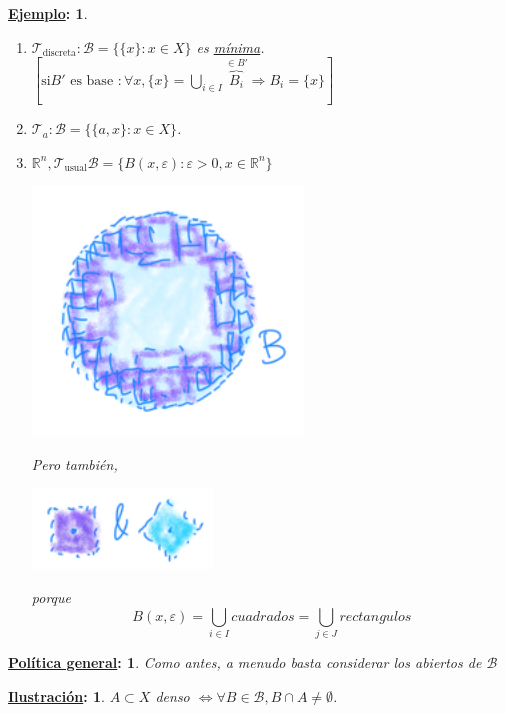 \documentclass[10pt,a4paper,openright]{book}
\theoremstyle{break}
\newtheorem*{ej}{\underline{Ejemplo}:}
\newtheorem*{pg}{\underline{Política general}:}
\newtheorem*{il}{\underline{Ilustración}:}
\begin{document}
\begin{ej}
\begin{enumerate}
    \item $\mathcal{T}_{\text{discreta}} : \mathcal{B} = \{\{x\} : x \in X\}$ es \underline{mínima}. $\left[ \text{si} B' \text{ es base } : \forall x, \{x\} = \bigcup_{i \in  I} \overbrace{B_i}^{\in B'} \Rightarrow B_i = \{x\} \right]$ 
    \item $\mathcal{T}_a: \mathcal{B} = \{\{a, x\} : x \in X\}$.
    \item $\mathbb{R}^n, \mathcal{T}_{\text{usual}} \mathcal{B} = \{B\left( x, \varepsilon \right) : \varepsilon > 0, x \in \mathbb{R}^n\}$
    \begin{center}
        \includegraphics[scale=0.3]{images/base_rn} 
    \end{center}
    Pero también,
    \begin{center}
        \includegraphics[scale=0.3]{images/bases_alternativas_rn} 
    \end{center}
    porque
    \[
    B\left( x, \varepsilon \right) = \bigcup_{i \in  I} cuadrados = \bigcup_{j \in J} rectangulos
    \]
\end{enumerate}
\end{ej}

\begin{pg}
    Como antes, a menudo basta considerar los abiertos de $\mathcal{B}$ 
\end{pg}

\begin{il}
$A \subset X$ denso $\Leftrightarrow \forall B \in \mathcal{B}, B \cap A \neq \emptyset$.
\end{il}
\end{document}
